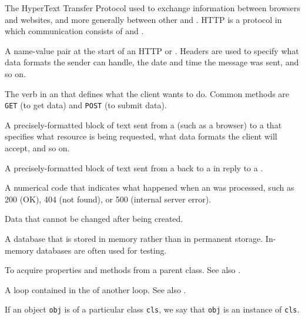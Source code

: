 \begin{description}
The HyperText Transfer Protocol used to exchange information between browsers
and websites, and more generally between other  and
. HTTP is a  protocol in which
communication consists of  and
.

A name-value pair at the start of an HTTP  or
. Headers are used to specify what data formats
the sender can handle, the date and time the message was sent, and so on.

The verb in an  that defines what the client
wants to do. Common methods are \texttt{GET} (to get data) and \texttt{POST} (to submit
data).

A precisely-formatted block of text sent from a  (such as a
browser) to a  that specifies what resource is being
requested, what data formats the client will accept, and so on.

A precisely-formatted block of text sent from a  back to a
 in reply to a .

A numerical code that indicates what happened when an  was processed, such as 200 (OK), 404 (not found), or
500 (internal server error).

Data that cannot be changed after being created.

A database that is stored in memory rather than in permanent storage.
In-memory databases are often used for testing.

To acquire properties and methods from a parent class. See also
.

A loop contained in the  of another loop.
See also .

If an object \texttt{obj} is of a particular class \texttt{cls},
we say that \texttt{obj} is an instance of \texttt{cls}.


\end{description}
